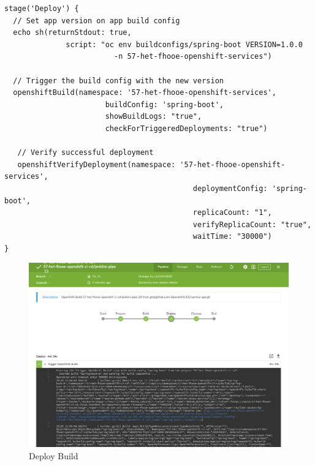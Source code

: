 \begin{verbatim}
stage('Deploy') {
  // Set app version on app build config
  echo sh(returnStdout: true, 
              script: "oc env buildconfigs/spring-boot VERSION=1.0.0 
                         -n 57-het-fhooe-openshift-services")

  // Trigger the build config with the new version
  openshiftBuild(namespace: '57-het-fhooe-openshift-services',
                       buildConfig: 'spring-boot', 
                       showBuildLogs: "true", 
                       checkForTriggeredDeployments: "true")
                       
   // Verify successful deployment
   openshiftVerifyDeployment(namespace: '57-het-fhooe-openshift-services',
                                           deploymentConfig: 'spring-boot', 
                                           replicaCount: "1", 
                                           verifyReplicaCount: "true",
                                           waitTime: "30000")
}
\end{verbatim}

\begin{figure}[H]
	\centering
	\includegraphics[scale=0.35]{image/jenkins-deploy.png}
	\caption{Deploy Build}
	\label{fig:architecture}
\end{figure}